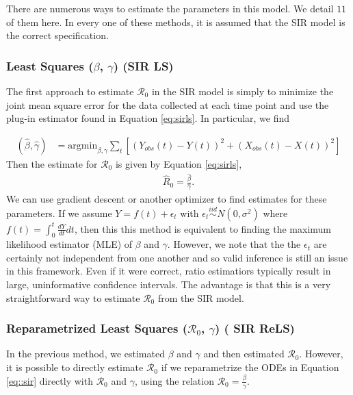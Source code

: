 \documentclass[12pt]{article}
\newcommand{\xxsir}{\ensuremath{11}} %
\newcommand{\rr}{\ensuremath{\mathcal{R}_0}}
\begin{document}
There are numerous ways to estimate the parameters in this model.  We detail $\xxsir$ of them here.  In every one of these methods, it is assumed that the SIR model is the correct specification.

\subsubsection{Least Squares ($\beta$, $\gamma$) (SIR LS)}\label{least-squares-beta-gamma}
The first approach to estimate $\rr$ in the SIR model is simply to minimize the joint mean square error for the data collected at each time point and use the plug-in estimator found in Equation \ref{eq:sirls}.  In particular, we find

\begin{align*}
(\hat{\beta}, \hat{\gamma} )&=\text{argmin}_{\beta, \gamma} \sum_{t} \left [ \left (Y_{obs}(t) - Y(t)\right )^2 + \left ( X_{obs}(t) - X(t) \right )^2 \right ]
\end{align*}
Then  the estimate for $\rr$ is given by Equation \ref{eq:sirls},
\begin{align}\label{eq:sirls}
  \hat{R}_0= \frac{\hat{\beta}}{\hat{\gamma}}.
  \end{align}
We can use gradient descent or another optimizer to find estimates for these parameters.  If we assume $Y= f(t) + \epsilon_t$ with $\epsilon_t \overset{iid}{\sim} N(0, \sigma^2)$ where $f(t) = \int_0^t \frac{dY}{dt} dt$, then this this method is equivalent to finding the maximum likelihood estimator (MLE) of $\beta$ and $\gamma$.  However, we note that the the $\epsilon_t$ are certainly not independent from one another and so valid inference is still an issue in this framework.  Even if it were correct, ratio estimatiors typically result in large, uninformative confidence intervals.   The advantage is that this is a very straightforward way to estimate $\rr$ from the SIR model.

\subsubsection{Reparametrized Least Squares ($\rr$, $\gamma$) ( SIR ReLS)}\label{reparametrized-least-squares-rux5f0-gamma}

In the previous method, we estimated $\beta$ and $\gamma$ and then estimated $\rr$.  However, it is possible to directly estimate $\rr$ if we reparametrize the ODEs in Equation \eqref{eq::sir} directly with \(\rr\) and \(\gamma\), using the relation $\rr = \frac{\beta}{\gamma}$.
\end{document}
